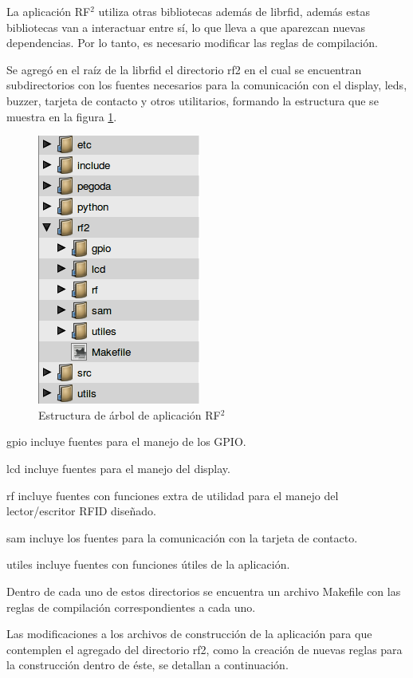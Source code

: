 \bigskip
La aplicación RF$^{2}$ utiliza otras bibliotecas además de librfid, además estas bibliotecas van a interactuar entre sí, lo que lleva a que aparezcan nuevas dependencias. Por lo tanto, es necesario modificar las reglas de compilación.

\bigskip
Se agregó en el raíz de la librfid el directorio rf2 en el cual se encuentran subdirectorios con los fuentes necesarios para la comunicación con el display, leds, buzzer, tarjeta de contacto y otros utilitarios, formando la estructura que se muestra en la figura \ref{est_RF2}. 


\begin{figure}[H]
\centering
  \begin{center}
  \includegraphics[scale=.5]{Imagenes/estructura_librfid.png} 
  \end{center}
  \caption{Estructura de árbol de aplicación RF$^{2}$}\label{est_RF2} 
\end{figure}

gpio incluye fuentes para el manejo de los GPIO.

lcd incluye fuentes para el manejo del display.

rf incluye fuentes con funciones extra de utilidad para el manejo del lector/escritor RFID diseñado.

sam incluye los fuentes para la comunicación con la tarjeta de contacto.

utiles incluye fuentes con funciones útiles de la aplicación.

\bigskip
Dentro de cada uno de estos directorios se encuentra un archivo Makefile con las reglas de compilación correspondientes a cada uno.

\bigskip
Las modificaciones a los archivos de construcción de la aplicación para que contemplen el agregado del directorio rf2, como la creación de nuevas reglas para la construcción dentro de éste, se detallan a continuación.

